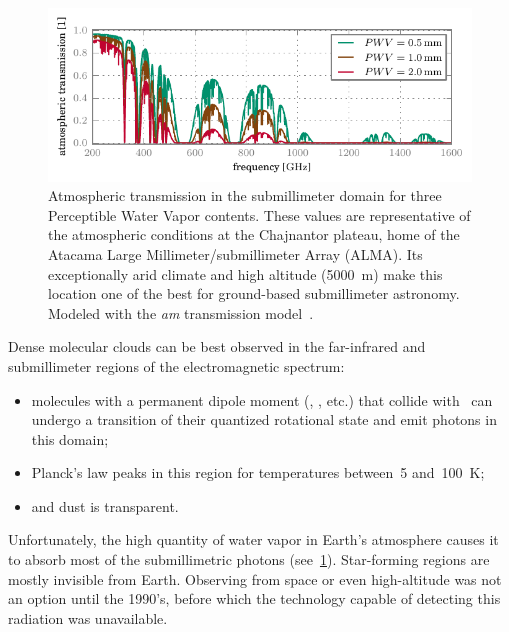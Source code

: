 \begin{figure}
    \centering
    \includegraphics{atmos_trans}
    \caption{
        Atmospheric transmission in the submillimeter domain
        for three Perceptible Water Vapor contents.
        These values are representative of the atmospheric conditions
        at the Chajnantor plateau, home of the
        Atacama Large Millimeter/submillimeter Array (ALMA).
        Its exceptionally arid climate and high altitude (\SI{5000}{\meter}) make
        this location
        one of the best for ground-based submillimeter astronomy.
        Modeled with the \textit{am} transmission model~\autocite{pardo2001atmospheric}.
    }
    \label{fig:atmospheric_electromagnetic_transmission}
\end{figure}

\begin{samepage}
Dense molecular clouds can be best observed in the far-infrared and submillimeter regions of the electromagnetic spectrum:
\begin{itemize}[noitemsep,nolistsep]
    \item molecules with a permanent dipole moment (, , etc.) that collide with~ can undergo a transition of their quantized rotational state and emit photons in this domain;
    \item Planck's law peaks in this region for temperatures between~\num{5} and~\SI{100}{\kelvin};
    \item and dust is transparent.
\end{itemize}
\end{samepage}
Unfortunately, the high quantity of water vapor in Earth's atmosphere causes it to absorb most of the submillimetric photons (see~\cref{fig:atmospheric_electromagnetic_transmission}).
Star-forming regions are mostly invisible from Earth.
Observing from space or even high-altitude was not an option until the 1990's, before which the technology capable of detecting this radiation was unavailable.

